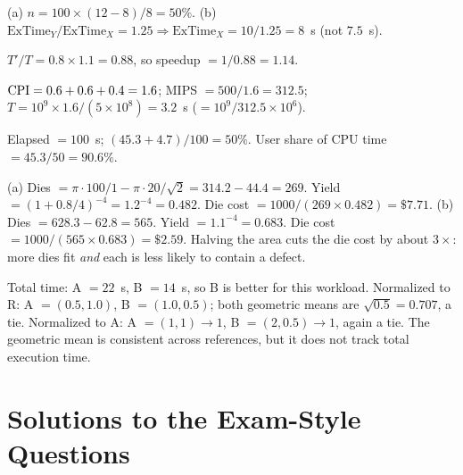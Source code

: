 \documentclass[11pt]{article}
\begin{document}
\begin{solution}[\ref{p:percent}]
(a) $n = 100\times(12-8)/8 = 50\%$.
(b) $\text{ExTime}_Y/\text{ExTime}_X = 1.25 \Rightarrow \text{ExTime}_X
= 10/1.25 = 8$~s (not $7.5$~s).
\end{solution}

\begin{solution}[\ref{p:compilerchange}]
$T'/T = 0.8\times1.1 = 0.88$, so speedup $=1/0.88 = 1.14$.
\end{solution}

\begin{solution}[\ref{p:mips}]
$\mathrm{CPI} = 0.6+0.6+0.4 = 1.6$; MIPS $=500/1.6 = 312.5$;
$T = 10^9\times1.6/(5\times10^8) = 3.2$~s ($=10^9/312.5\times10^6$).
\end{solution}

\begin{solution}[\ref{p:unix}]
Elapsed $=100$~s; $(45.3+4.7)/100 = 50\%$. User share of CPU time
$=45.3/50 = 90.6\%$.
\end{solution}

\begin{solution}[\ref{p:die}]
(a) Dies $= \pi\cdot100/1 - \pi\cdot20/\sqrt2 = 314.2-44.4 = 269$.
Yield $=(1+0.8/4)^{-4} = 1.2^{-4} = 0.482$. Die cost
$=1000/(269\times0.482) = \$7.71$.
(b) Dies $=628.3 - 62.8 = 565$. Yield $=1.1^{-4}=0.683$. Die cost
$=1000/(565\times0.683) = \$2.59$.
Halving the area cuts the die cost by about $3\times$: more dies fit
\emph{and} each is less likely to contain a defect.
\end{solution}

\begin{solution}[\ref{p:geo}]
Total time: A $=22$~s, B $=14$~s, so B is better for this workload.
Normalized to R: A $=(0.5, 1.0)$, B $=(1.0, 0.5)$; both geometric means
are $\sqrt{0.5}=0.707$, a tie. Normalized to A: A $=(1,1)\to1$, B
$=(2, 0.5)\to1$, again a tie. The geometric mean is consistent across
references, but it does not track total execution time.
\end{solution}

\section{Solutions to the Exam-Style Questions}
\end{document}
